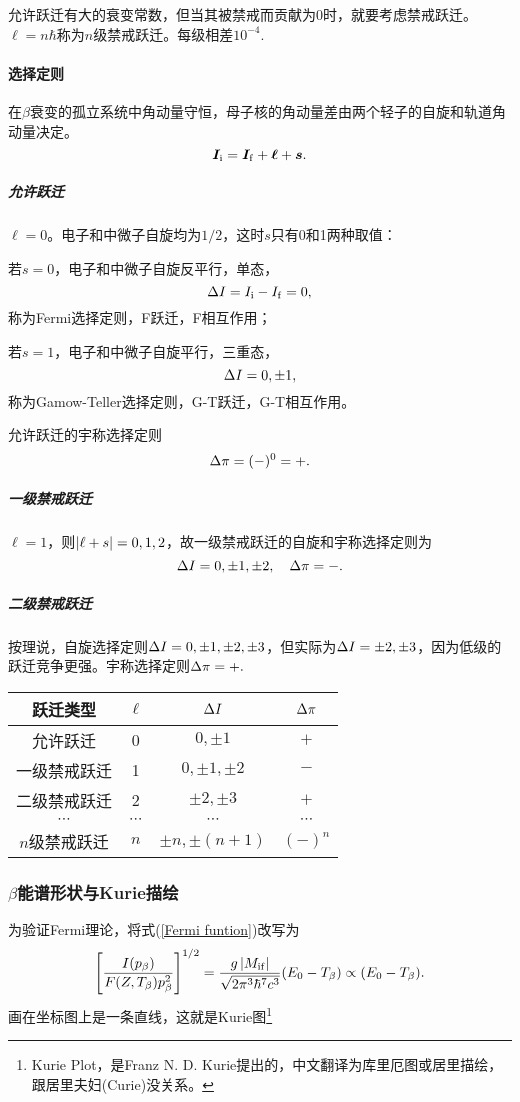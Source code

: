 允许跃迁有大的衰变常数，但当其被禁戒而贡献为0时，就要考虑禁戒跃迁。$\ell=n\hbar$称为$n$级禁戒跃迁。每级相差$10^{-4}.$
\paragraph{选择定则}在$\beta$衰变的孤立系统中角动量守恒，母子核的角动量差由两个轻子的自旋和轨道角动量决定。
\[
	\bm I_{\mathrm{i}}=\bm I_{\mathrm{f}}+\bm\ell+\bm s.
\]

\subparagraph{允许跃迁}
$\ell=0$。电子和中微子自旋均为$1/2$，这时$s$只有0和1两种取值：
\begin{compactenum}
	\item 若$s=0$，电子和中微子自旋反平行，单态，
	\[
		\Delta I=I_{\mathrm{i}}-I_{\mathrm{f}}=0,
	\]
	称为Fermi选择定则，F跃迁，F相互作用；
	\item 若$s=1$，电子和中微子自旋平行，三重态，
	\[
		\Delta I=0,\pm 1,
	\]
	称为Gamow-Teller选择定则，G-T跃迁，G-T相互作用。
\end{compactenum}
允许跃迁的宇称选择定则
\[
	\Delta\pi=(-)^0=+.
\]
\subparagraph{一级禁戒跃迁}
$\ell=1$，则$\left\lvert\ell+s\right\rvert=0,1,2$，故一级禁戒跃迁的自旋和宇称选择定则为
\[
	\Delta I=0,\pm 1,\pm 2,\quad\Delta\pi=-.
\]
\subparagraph{二级禁戒跃迁}
按理说，自旋选择定则$\Delta I=0,\pm 1,\pm 2,\pm 3$，但实际为$\Delta I=\pm 2,\pm 3$，因为低级的跃迁竞争更强。宇称选择定则$\Delta\pi=+.$
\begin{center}
	\begin{tabular}{cccc}
		\toprule
		跃迁类型&$\ell$&$\Delta I$&$\Delta\pi$\\
		\midrule
		允许跃迁&0&$0,\pm 1$&$+$\\
		一级禁戒跃迁&1&$0,\pm 1,\pm 2$&$-$\\
		二级禁戒跃迁&2&$\pm 2,\pm 3$&$+$\\
		$\cdots$&$\cdots$&$\cdots$&$\cdots$\\
		$n$级禁戒跃迁&$n$&$\pm n,\pm(n+1)$&$(-)^n$\\
		\bottomrule
	\end{tabular}
\end{center}
\subsubsection[\textit{\textbeta}能谱形状与Kurie描绘]{$\beta$能谱形状与Kurie描绘}
为验证Fermi理论，将式(\ref{Fermi funtion})改写为
\[
	\left[\frac{I(p_\beta)}{F(Z,T_\beta)p_\beta^2}\right]^{1/2}=\frac{g\left\lvert M_{\mathrm{i}\mathrm{f}}\right\rvert}{\sqrt{2\pi^3\hbar^7c^3}}(E_0-T_\beta)\propto(E_0-T_\beta).
\]
画在坐标图上是一条直线，这就是Kurie图\footnote{Kurie Plot，是Franz N. D. Kurie提出的，中文翻译为库里厄图或居里描绘，跟居里夫妇(Curie)没关系。}

